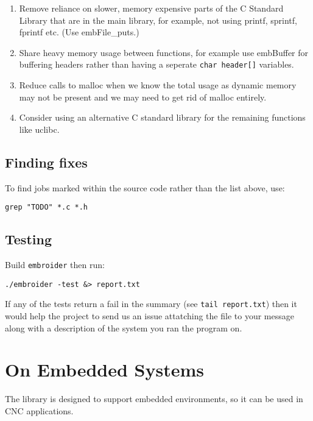 \documentclass[onesize, a4paper]{refart}
\providecommand{\tightlist}{\setlength{\itemsep}{0pt}\setlength{\parskip}{0pt}}
\begin{document}
\begin{enumerate}
  \begin{enumerate}
  \def\labelenumii{\arabic{enumii}.}
  \tightlist
  \item Remove reliance on slower, memory expensive parts of the C Standard
    Library that are in the main library, for example, not using printf,
    sprintf, fprintf etc. (Use embFile\_puts.)
  \item Share heavy memory usage between functions, for example use
    embBuffer for buffering headers rather than having a seperate
    \texttt{char\ header{[}{]}} variables.
  \item Reduce calls to malloc when we know the total usage as dynamic
    memory may not be present and we may need to get rid of malloc
    entirely.
  \item Consider using an alternative C standard library for the remaining
    functions like uclibc.
  \end{enumerate}
\end{enumerate}

\subsection{Finding fixes}

To find jobs marked within the source code rather than the list above,
use:

\begin{verbatim}
grep "TODO" *.c *.h
\end{verbatim}

\subsection{Testing}

Build \texttt{embroider} then run:

\begin{verbatim}
./embroider -test &> report.txt
\end{verbatim}

If any of the tests return a fail in the summary (see
\texttt{tail\ report.txt}) then it would help the project to send us an
issue attatching the file to your message along with a description of
the system you ran the program on.

\section{On Embedded Systems}

The library is designed to support embedded environments, so it can
be used in CNC applications.
\end{document}
